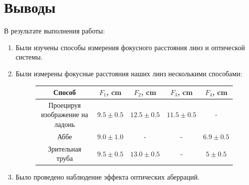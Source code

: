 \documentclass{article}
\begin{document}
\section{Выводы}
В результате выполнения работы:
\begin{enumerate}
  \item Были изучены способы измерения фокусного расстояния линз и оптической системы.
  \item Были измерены фокусные расстояния наших линз несколькими способами: 
  \begin{figure}[H]
    \centering
    \begin{tabular}{|c|c|c|c|c|}
      \hline
      Способ & \(F_1\), cm & \(F_2\), cm & \(F_3\), cm & \(F_4\), cm \\\hline
      Проецируя изображение на ладонь   & \(9.5 \pm 0.5\) & \(12.5 \pm 0.5\) & \(11.5\pm 0.5\) & - \\\hline
      Аббе     & \(9.0 \pm 1.0\) & - & - &\(6.9 \pm 0.5\) \\\hline
      Зрительная труба & \(9.5 \pm 0.5\) & \(13.0 \pm 0.5\) & - &\(5 \pm 0.5\) \\\hline
    \end{tabular}
  \end{figure}
  \item Было проведено наблюдение эффекта оптических аберраций.
\end{enumerate}
\end{document}
